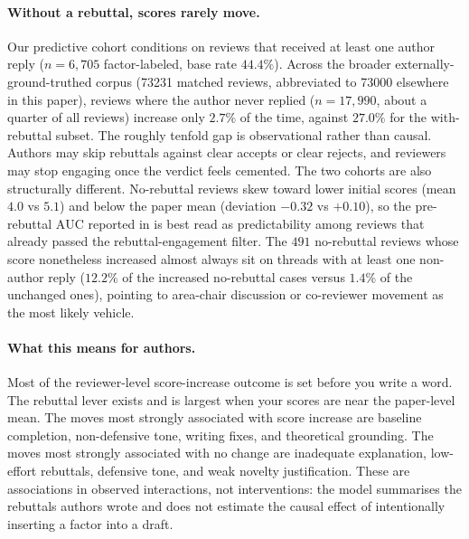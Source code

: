 \documentclass{article}
\newcommand{\auc}{\text{AUC}}
\begin{document}
\paragraph{Without a rebuttal, scores rarely move.} Our predictive cohort conditions on reviews that received at least one author reply ($n=6{,}705$ factor-labeled, base rate $44.4\%$). Across the broader externally-ground-truthed corpus (\num{73231} matched reviews, abbreviated to \num{73000} elsewhere in this paper), reviews where the author never replied ($n=17{,}990$, about a quarter of all reviews) increase only $2.7\%$ of the time, against $27.0\%$ for the with-rebuttal subset. The roughly tenfold gap is observational rather than causal. Authors may skip rebuttals against clear accepts or clear rejects, and reviewers may stop engaging once the verdict feels cemented. The two cohorts are also structurally different. No-rebuttal reviews skew toward lower initial scores (mean $4.0$ vs $5.1$) and below the paper mean (deviation $-0.32$ vs $+0.10$), so the pre-rebuttal $\auc$ reported in  is best read as predictability among reviews that already passed the rebuttal-engagement filter. The $491$ no-rebuttal reviews whose score nonetheless increased almost always sit on threads with at least one non-author reply ($12.2\%$ of the increased no-rebuttal cases versus $1.4\%$ of the unchanged ones), pointing to area-chair discussion or co-reviewer movement as the most likely vehicle.

\paragraph{What this means for authors.} Most of the reviewer-level score-increase outcome is set before you write a word. The rebuttal lever exists and is largest when your scores are near the paper-level mean. The moves most strongly associated with score increase are baseline completion, non-defensive tone, writing fixes, and theoretical grounding. The moves most strongly associated with no change are inadequate explanation, low-effort rebuttals, defensive tone, and weak novelty justification. These are associations in observed interactions, not interventions: the model summarises the rebuttals authors wrote and does not estimate the causal effect of intentionally inserting a factor into a draft.
\end{document}
